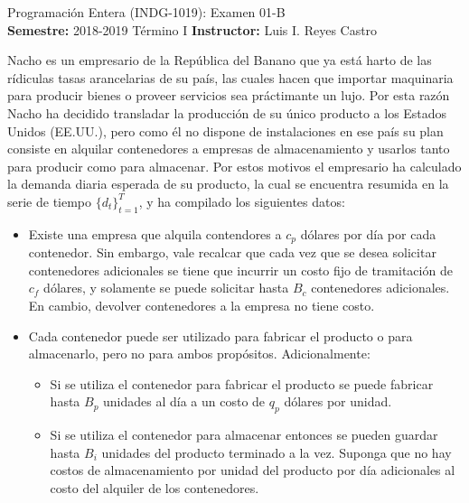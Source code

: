 \documentclass[ a4paper, twoside, 11pt]{article}
\newcommand{\numero}{01}
\begin{document}
\allowdisplaybreaks



\begin{center}
\Large Programaci\'on Entera (INDG-1019): Examen \numero-B \\[1ex]
\small \textbf{Semestre:} 2018-2019 T\'ermino I \qquad
\textbf{Instructor:} Luis I. Reyes Castro
\end{center}
\fullskip

\begin{problem}
Nacho es un empresario de la Rep\'ublica del Banano que ya est\'a harto de las r\'idiculas tasas arancelarias de su pa\'is, las cuales hacen que importar maquinaria para producir bienes o proveer servicios sea pr\'actimante un lujo. Por esta raz\'on Nacho ha decidido transladar la producci\'on de su \'unico producto a los Estados Unidos (EE.UU.), pero como \'el no dispone de instalaciones en ese pa\'is su plan consiste en alquilar contenedores a empresas de almacenamiento y usarlos tanto para producir como para almacenar. Por estos motivos el empresario ha calculado la demanda diaria esperada de su producto, la cual se encuentra resumida en la serie de tiempo $\{ d_t \}_{t=1}^T$, y ha compilado los siguientes datos: 
\begin{itemize}
\item Existe una empresa que alquila contendores a $c_p$ d\'olares por d\'ia por cada contenedor. Sin embargo, vale recalcar que cada vez que se desea solicitar contenedores adicionales se tiene que incurrir un costo fijo de tramitaci\'on de $c_f$ d\'olares, y solamente se puede solicitar hasta $B_c$ contenedores adicionales. En cambio, devolver contenedores a la empresa no tiene costo. 
\item Cada contenedor puede ser utilizado para fabricar el producto o para almacenarlo, pero no para ambos prop\'ositos. Adicionalmente: 
\begin{itemize}
\item Si se utiliza el contenedor para fabricar el producto se puede fabricar hasta $B_p$ unidades al d\'ia a un costo de $q_p$ d\'olares por unidad. 
\item Si se utiliza el contenedor para almacenar entonces se pueden guardar hasta $B_i$ unidades del producto terminado a la vez. Suponga que no hay costos de almacenamiento por unidad del producto por d\'ia adicionales al costo del alquiler de los contenedores. 
\end{itemize}
\end{itemize}


\end{problem}
\end{document}
